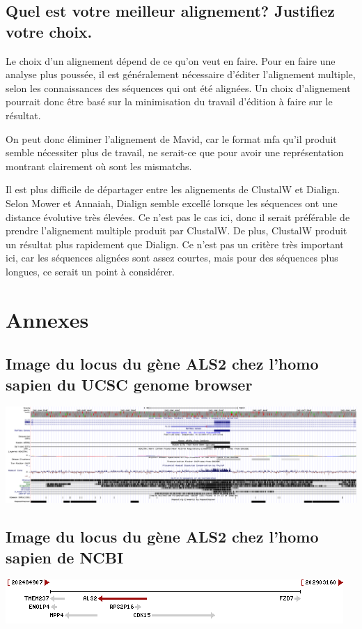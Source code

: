 \documentclass[10.8pt]{article} %
\renewcommand{\thesubsection}{\alph{subsection}}
\begin{document}
\subsection[Meilleur alignement]{Quel est votre meilleur alignement? Justifiez votre choix.}

Le choix d'un alignement dépend de ce qu'on veut en faire. Pour en faire une analyse plus poussée, il est
généralement nécessaire d'éditer l'alignement multiple, selon les connaissances des séquences qui ont été
alignées. Un choix d'alignement pourrait donc être basé sur la minimisation du travail d'édition à faire
sur le résultat.

On peut donc éliminer l'alignement de Mavid, car le format mfa qu'il produit semble nécessiter plus de
travail, ne serait-ce que pour avoir une représentation montrant clairement où sont les mismatchs.

Il est plus difficile de départager entre les alignements de ClustalW et Dialign. Selon Mower et Annaiah, 
Dialign semble excellé lorsque les séquences ont une distance évolutive très élevées. Ce n'est pas le cas
ici, donc il serait préférable de prendre l'alignement multiple produit par ClustalW. De plus, ClustalW
produit un résultat plus rapidement que Dialign. Ce n'est pas un critère très important ici, car
les séquences alignées sont assez courtes, mais pour des séquences plus longues, ce serait un
point à considérer.

\begingroup
\renewcommand{\appendix}{%
    \renewcommand{\thesubsection}{\arabic{subsection}}
}

\newpage
\appendix
\section{Annexes}
\subsection{Image du locus du gène ALS2 chez l'homo sapien du UCSC genome browser}\label{1}
\includegraphics[width=\linewidth]{annexes/annexe1_ucsc.png}

\subsection{Image du locus du gène ALS2 chez l'homo sapien de NCBI}\label{2}
\includegraphics{annexes/annexe1_ncbi_als2.png}
\end{document}
